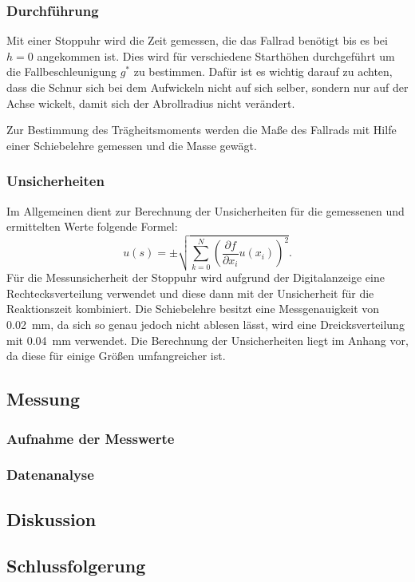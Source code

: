 		\subsubsection{Durchführung}
			
			Mit einer Stoppuhr wird die Zeit gemessen, die das Fallrad benötigt bis es bei $h=0$ angekommen ist. Dies wird für verschiedene Starthöhen durchgeführt um die Fallbeschleunigung $g^{*}$ zu bestimmen. Dafür ist es wichtig darauf zu achten, dass die Schnur sich bei dem Aufwickeln nicht auf sich selber, sondern nur auf der Achse wickelt, damit sich der Abrollradius nicht verändert.
			
			Zur Bestimmung des Trägheitsmoments werden die Maße des Fallrads mit Hilfe einer Schiebelehre gemessen und die Masse gewägt.			
			
		\subsubsection{Unsicherheiten}
			
			Im Allgemeinen dient zur Berechnung der Unsicherheiten für die gemessenen und ermittelten Werte folgende Formel: 
			\begin{equation*}
				u(s) = \pm \sqrt{\sum_{k=0}^{N}\left( \frac{\partial f}{\partial x_i}u(x_i)\right) ^2}. \label{eq:kombUnsicherheit}
			\end{equation*}
			Für die Messunsicherheit der Stoppuhr wird aufgrund der Digitalanzeige eine Rechtecksverteilung verwendet und diese dann mit der Unsicherheit für die Reaktionszeit kombiniert. Die Schiebelehre besitzt eine Messgenauigkeit von \SI{0,02}{\mm}, da sich so genau jedoch nicht ablesen lässt, wird eine Dreicksverteilung mit  \SI{0,04}{\mm} verwendet.
			Die Berechnung der Unsicherheiten liegt im Anhang vor, da diese für einige Größen umfangreicher ist.
			
	\subsection{Messung}
	
		\subsubsection{Aufnahme der Messwerte}
	
		\subsubsection{Datenanalyse}	

	\subsection{Diskussion}
		
	\subsection{Schlussfolgerung}
	